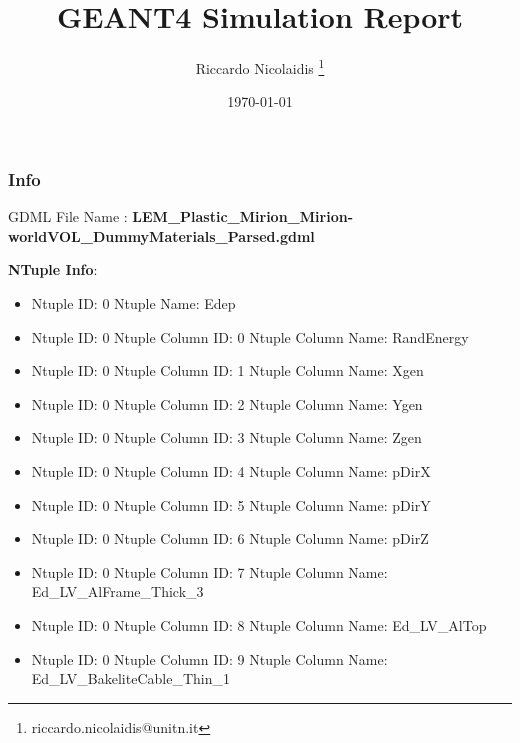 \documentclass[8pt]{beamer}
\title{GEANT4 Simulation Report}
\author{Riccardo Nicolaidis \footnote{riccardo.nicolaidis@unitn.it}}
\date{\today}
\begin{document}
        
            \begin{frame}
                \titlepage
            \end{frame}
            
            \begin{frame}
                \frametitle{Info}
            
                \centering
                GDML File Name : \textbf{ LEM\_Plastic\_Mirion\_Mirion-worldVOL\_DummyMaterials\_Parsed.gdml}
                
                
                \vspace{2 cm}
                \textbf{NTuple Info}:
                \vspace{1 cm}
                
        \begin{itemize}
        
        \item Ntuple ID: 0 Ntuple Name: Edep
        
        \item Ntuple ID: 0 Ntuple Column ID: 0 Ntuple Column Name: RandEnergy
        
        \item Ntuple ID: 0 Ntuple Column ID: 1 Ntuple Column Name: Xgen
        
        \item Ntuple ID: 0 Ntuple Column ID: 2 Ntuple Column Name: Ygen
        
        \item Ntuple ID: 0 Ntuple Column ID: 3 Ntuple Column Name: Zgen
        
        \item Ntuple ID: 0 Ntuple Column ID: 4 Ntuple Column Name: pDirX
        
        \item Ntuple ID: 0 Ntuple Column ID: 5 Ntuple Column Name: pDirY
        
        \item Ntuple ID: 0 Ntuple Column ID: 6 Ntuple Column Name: pDirZ
        
        \item Ntuple ID: 0 Ntuple Column ID: 7 Ntuple Column Name: Ed\_LV\_AlFrame\_Thick\_3
        
        \item Ntuple ID: 0 Ntuple Column ID: 8 Ntuple Column Name: Ed\_LV\_AlTop
        
        \item Ntuple ID: 0 Ntuple Column ID: 9 Ntuple Column Name: Ed\_LV\_BakeliteCable\_Thin\_1
        

\end{itemize}
\end{frame}
\end{document}
